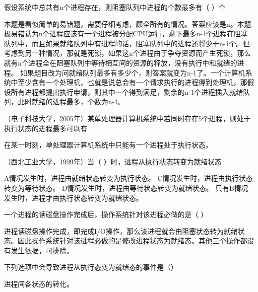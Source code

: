 \question 假设系统中总共有n个进程存在，则阻塞队列中进程的个数最多有（ ）个
\par{}
\begin{solution}本题是看似简单的易错题，需要仔细考虑，顾全所有的情况。答案应该是n。本题极易错认为n个进程应该有一个进程被分配CPU运行，剩下最多n-1个进程在阻塞队列中，而且如果就绪队列中有进程的话，阻塞队列中的进程还将少于n-1个。但考虑到另一种情况，那就是死锁，如果这n个进程由于争夺资源而产生死锁，那么就有n个进程全在阻塞队列中等待相互间的资源的释放，没有执行中和就绪的进程。
如果题目改为问就绪队列最多有多少个，则答案就变为n-1了。一个计算机系统中至少含有一个处理机，也就是说总会有一个请求执行的进程得到处理机，那假设所有进程都提出执行申请，则其中一个得到满足，剩余的n-1个进程插入就绪队列，此时就绪的进程最多，个数为n-1。
\end{solution}
\question （电子科技大学，2005年）某单处理器计算机系统中若同时存在5个进程，则处于执行状态的进程最多可以有
\par{}
\begin{solution}在某一时刻，单处理器计算机系统中只能有一个进程处于执行状态。
\end{solution}
\question （西北工业大学，1999年）当（ ）时，进程从执行状态转变为就绪状态
\par{}
\begin{solution}A情况发生时，进程由就绪状态转变为执行状态。
C情况发生时，进程由执行状态转变为等待状态。
D情况发生时，进程由等待状态转变为就绪状态。
只有B情况发生时，进程才由执行状态转变为就绪状态。
\end{solution}
\question 一个进程的读磁盘操作完成后，操作系统针对该进程必做的是（ ）
\par{}
\begin{solution}进程读磁盘操作完成，即完成I/O操作，那么该进程就会由阻塞状态转为就绪状态。因此操作系统针对该进程必做的是修改进程状态为就绪态。其他三个操作都没有发生依据，可排除。
\end{solution}
\question 下列选项中会导致进程从执行态变为就绪态的事件是（）
\par{}
\begin{solution}进程间各状态的转化。
\end{solution}
